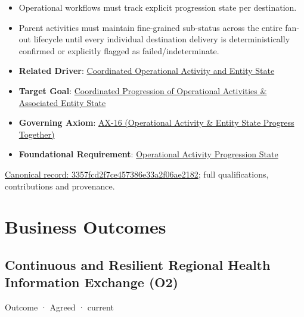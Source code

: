 \begin{itemize}


\item Operational workflows must track explicit progression state per destination.

\item Parent activities must maintain fine-grained sub-status across the entire fan-out lifecycle until every individual destination delivery is deterministically confirmed or explicitly flagged as failed/indeterminate.

\item \textbf{Related Driver}: \href{\detokenize{../../../../../docs/markdown/01-motivation/drivers-assessments/drivers.md}}{Coordinated Operational Activity and Entity State}

\item \textbf{Target Goal}: \href{\detokenize{../../../../../docs/markdown/01-motivation/goals-outcomes/strategic-goals.md}}{Coordinated Progression of Operational Activities \& Associated Entity State}

\item \textbf{Governing Axiom}: \hyperref[element:de7e90f46127455a9ec9ad3b9b48ba54]{AX-16 (Operational Activity \& Entity State Progress Together)}

\item \textbf{Foundational Requirement}: \href{\detokenize{../../../../../docs/markdown/01-motivation/requirements-constraints/foundational-requirements.md}}{\texttt{} Operational Activity Progression State}

\end{itemize}

{\footnotesize \href{../../../../continuum/motivation/assessment/3357fcd2f7ce457386e33a2f06ae2182.md}{Canonical record: 3357fcd2f7ce457386e33a2f06ae2182}; full qualifications, contributions and provenance.}\par
\chapter{Business Outcomes}

\section{Continuous and Resilient Regional Health Information Exchange (O2)}

\label{element:aed90b4a88f24b78adfeadbf0bca8980}
{\small Outcome · Agreed · current}\par

